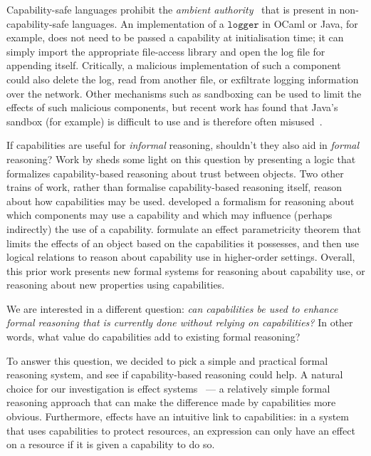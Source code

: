 \documentclass[sigplan,10pt,review]{acmart}\settopmatter{printfolios=true,printccs=false,printacmref=false}
\newcommand{\kwat}[1]{$\kwa{#1}$}
\newcommand{\kwa}[1]{\mathtt{#1}}
\begin{document}
Capability-safe languages prohibit the \textit{ambient authority}~\cite{miller06} that is present in non-capability-safe languages.
An implementation of a \kwat{logger} in OCaml or Java, for example, does not need to be passed a capability at initialisation time; it can simply import the appropriate file-access library and open the log file for appending itself.
Critically, a malicious implementation of such a component could also delete the log, read from another file, or exfiltrate logging information over the network.
Other mechanisms such as sandboxing can be used to limit the effects of such malicious components, but recent work has found that Java's sandbox (for example) is difficult to use and is therefore often misused~\cite{coker15}. %


If capabilities are useful for \textit{informal} reasoning, shouldn't they also aid in \textit{formal} reasoning?
Work by \citet{drossopoulou07} sheds some light on this question by presenting a logic that formalizes capability-based reasoning about trust between objects.
Two other trains of work, rather than formalise capability-based reasoning itself, reason about how capabilities may be used.
\citet{dimoulas14} developed a formalism for reasoning about which components may use a capability and which may influence (perhaps indirectly) the use of a capability.
\citet{devriese16} formulate an effect parametricity theorem that limits the effects of an object based on the capabilities it possesses, and then use logical relations to reason about capability use in higher-order settings.
Overall, this prior work presents new formal systems for reasoning about capability use, or reasoning about new properties using capabilities.

We are interested in a different question: \textit{can capabilities be used to enhance formal reasoning that is currently done without relying on capabilities?}
In other words, what value do capabilities add to existing formal reasoning?

To answer this question, we decided to pick a simple and practical formal reasoning system, and see if capability-based reasoning could help.
A natural choice for our investigation is effect systems~\cite{nielson99} --- a relatively simple formal reasoning approach that can make the difference made by capabilities more obvious.
Furthermore, effects have an intuitive link to capabilities: in a system that uses capabilities to protect resources, an expression can only have an effect on a resource if it is given a capability to do so.
\end{document}
